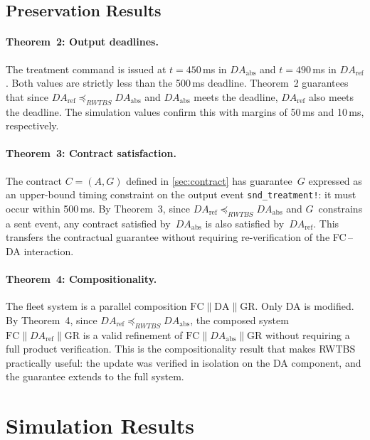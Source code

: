 \documentclass[11pt,a4paper]{article}
\newcommand{\DAabs}{\mathit{DA}_{\mathrm{abs}}}
\newcommand{\DAref}{\mathit{DA}_{\mathrm{ref}}}
\newcommand{\RWTBS}{RWTBS}
\begin{document}
\subsection{Preservation Results}
\label{sec:preservation}

\paragraph{Theorem~2: Output deadlines.}
The treatment command is issued at $t = 450$\,ms in $\DAabs$ and $t = 490$\,ms
in $\DAref$.  Both values are strictly less than the 500\,ms deadline.
Theorem~2 guarantees that since $\DAref \preceq_{\RWTBS{}} \DAabs$ and
$\DAabs$ meets the deadline, $\DAref$ also meets the deadline.  The simulation
values confirm this with margins of 50\,ms and 10\,ms, respectively.

\paragraph{Theorem~3: Contract satisfaction.}
The contract $C = (A, G)$ defined in \cref{sec:contract} has guarantee~$G$
expressed as an upper-bound timing constraint on the output event
\texttt{snd\_treatment!}: it must occur within 500\,ms.  By Theorem~3, since
$\DAref \preceq_{\RWTBS{}} \DAabs$ and $G$~constrains a sent event, any
contract satisfied by~$\DAabs$ is also satisfied by~$\DAref$.  This transfers
the contractual guarantee without requiring re-verification of the FC\,--\,DA
interaction.

\paragraph{Theorem~4: Compositionality.}
The fleet system is a parallel composition $\text{FC} \parallel \text{DA}
\parallel \text{GR}$.  Only DA is modified.  By Theorem~4, since
$\DAref \preceq_{\RWTBS{}} \DAabs$, the composed system
$\text{FC} \parallel \DAref \parallel \text{GR}$ is a valid refinement of
$\text{FC} \parallel \DAabs \parallel \text{GR}$ without requiring a full
product verification.  This is the compositionality result that makes \RWTBS{}
practically useful: the update was verified in isolation on the DA component,
and the guarantee extends to the full system.

\section{Simulation Results}
\label{sec:results}
\end{document}
